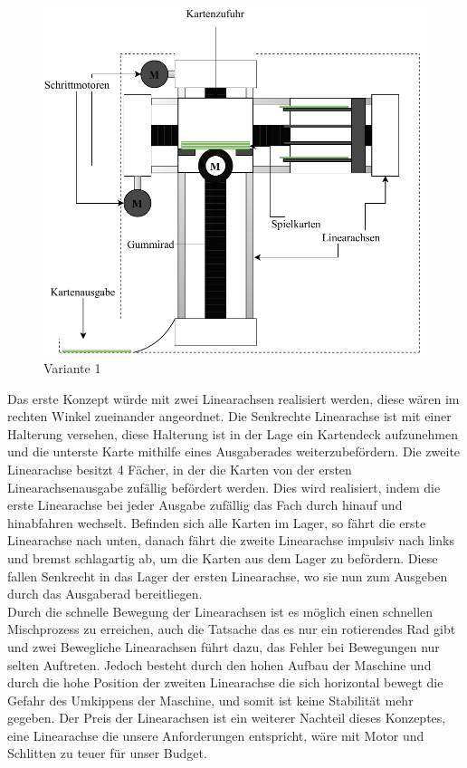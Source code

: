\begin{figure}[hb]
    \centering
    \includegraphics[scale=0.9,page=1]{fig/mech/Version1}
    \caption{Variante 1}

\end{figure}


Das erste Konzept würde mit zwei Linearachsen realisiert werden, diese wären im rechten Winkel zueinander
angeordnet. Die Senkrechte Linearachse ist mit einer Halterung versehen, diese Halterung ist in der Lage
ein Kartendeck aufzunehmen und die unterste Karte mithilfe eines Ausgaberades weiterzubefördern. Die zweite
Linearachse besitzt 4 Fächer, in der die Karten von der ersten Linearachsenausgabe zufällig befördert werden.
Dies wird realisiert, indem die erste Linearachse bei jeder Ausgabe zufällig das Fach durch hinauf und
hinabfahren wechselt. Befinden sich alle Karten im Lager, so fährt die erste Linearachse nach unten, danach
fährt die zweite Linearachse impulsiv nach links und bremst schlagartig ab, um die Karten aus dem Lager zu befördern. Diese fallen
Senkrecht in das Lager der ersten Linearachse, wo sie nun zum Ausgeben durch das Ausgaberad bereitliegen. \\



Durch die schnelle Bewegung der Linearachsen ist es möglich einen schnellen Mischprozess zu erreichen,
auch die Tatsache das es nur ein rotierendes Rad gibt und zwei Bewegliche Linearachsen führt dazu, das
Fehler bei Bewegungen nur selten Auftreten. Jedoch besteht durch den hohen Aufbau der Maschine und durch die hohe
Position der zweiten Linearachse die sich horizontal bewegt die Gefahr des Umkippens der Maschine, und somit ist
keine Stabilität mehr gegeben. Der Preis der Linearachsen ist ein weiterer Nachteil dieses Konzeptes, eine Linearachse
die unsere Anforderungen entspricht, wäre mit Motor und Schlitten zu teuer für unser Budget. \\

